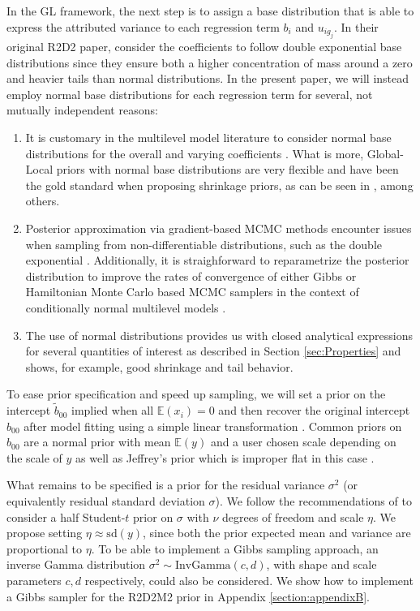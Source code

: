 In the GL framework, the next step is to assign a base distribution that is able to express the attributed variance to each regression term $b_i$ and $u_{ig_j}$. In their original R2D2 paper, \cite{r2d2zhang} consider the coefficients to follow double exponential base distributions since they ensure both a higher concentration of mass around a zero and heavier tails than normal distributions. In the present paper, we will instead employ normal base distributions for each regression term for several, not mutually independent reasons:
\begin{enumerate}
    \item It is customary in the multilevel model literature to
    consider normal base distributions for the overall and varying coefficients \cite{ gelman_hill_2006, wakefield2013bayesian}. What is more, Global-Local priors with normal base distributions are very flexible and have been the gold standard when proposing shrinkage priors, as can be seen in  \citep{Horseshoe,DirichletLaplace, BayesPenalizedRegSara}, among others.
    \item  Posterior approximation via gradient-based MCMC methods encounter issues when sampling from non-differentiable distributions, such as the double exponential \citep{handbookmcmc}. Additionally, it is straighforward to reparametrize the posterior distribution to improve the rates of convergence of either Gibbs or Hamiltonian Monte Carlo based MCMC samplers in the context of conditionally normal multilevel models \citep{brmsJSS, GibbsMultigrid}.
    \item  The use of normal distributions provides us with closed analytical expressions for several quantities of interest as described in Section \ref{sec:Properties} and shows, for example, good shrinkage and tail behavior.
\end{enumerate}

 To ease prior specification and speed up sampling, we will set a prior on the intercept $\tilde{b}_{00}$ implied when all $\mathbb{E}(x_i)=0$ and then recover the original intercept $b_{00}$ after model fitting using a simple linear transformation \citep{rstanarm, brmsJSS}. Common priors on $b_{00}$ are a normal prior with mean $\mathbb{E}(y)$ and a user chosen scale depending on the scale of $y$ as well as Jeffrey's prior which is improper flat in this case \citep{Jeffreys}.

What remains to be specified is a prior for the residual variance $\sigma^2$ (or equivalently residual standard deviation $\sigma$). We follow the recommendations of \cite{GelmanHalfStudentt} to consider a half Student-$t$ prior on $\sigma$ with $\nu$ degrees of freedom and scale $\eta$. We propose setting $\eta \approx \text{sd}(y)$, since both the prior expected mean and variance are proportional to $\eta$. To be able to implement a Gibbs sampling approach, an inverse Gamma distribution $\sigma^2 \sim \text{InvGamma} (c,d) $, with shape and scale parameters $c,d$ respectively, could also be considered. We show how to implement a Gibbs sampler for the R2D2M2 prior in Appendix \ref{section:appendixB}.

